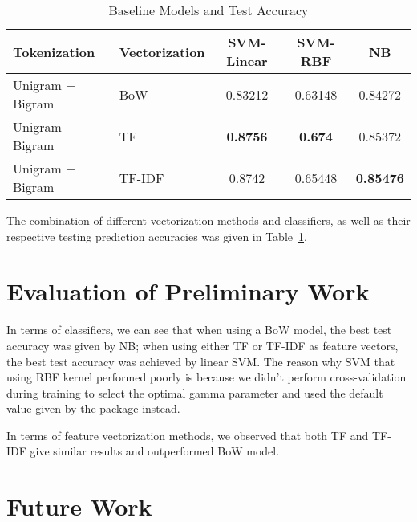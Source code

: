 \documentclass{article}
\begin{document}
\begin{table}[h]
  \caption{Baseline Models and Test Accuracy}\label{tab:a}
  \centering
  \begin{tabular}{ l l|| c | c | c} 
     \toprule
    Tokenization  & Vectorization & SVM-Linear & SVM-RBF & NB \\

    \midrule
    Unigram + Bigram & BoW  & 0.83212      & 0.63148    & 0.84272    \\
    Unigram + Bigram & TF & \textbf{0.8756}       & \textbf{0.674}     & 0.85372      \\
    Unigram + Bigram  & TF-IDF  & 0.8742      & 0.65448     & \textbf{0.85476}  \\
    \bottomrule
  \end{tabular}
\end{table}

The combination of different vectorization methods and classifiers, as well as their respective testing prediction accuracies was given in Table~\ref{tab:a}.


\section{Evaluation of Preliminary Work}

In terms of classifiers, we can see that when using a BoW model, the best test accuracy was given by NB; when using either TF or TF-IDF as feature vectors, the best test accuracy was achieved by linear SVM. The reason why SVM that using RBF kernel performed poorly is because we didn't perform cross-validation during training to select the optimal gamma parameter and used the default value given by the package instead.

In terms of feature vectorization methods, we observed that both TF and TF-IDF give similar results and outperformed BoW model.


\section{Future Work}
\end{document}
